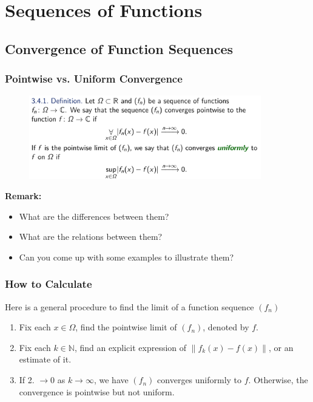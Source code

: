 \documentclass[10pt, t]{beamer}
\newcommand{\N}{\mathbb{N}}
\begin{document}
\section{Sequences of Functions}
\subsection{Convergence of Function Sequences}
\begin{frame}
    \frametitle{Pointwise vs. Uniform Convergence}

    \begin{figure}[H]
        \centering
        \includegraphics[width=0.9\textwidth]{2020-11-17-20-53-36.png}
    \end{figure}
    \textbf{Remark:}
    \begin{itemize}
        \item What are the differences between them?
        \item What are the relations between them?
        \item Can you come up with some examples to illustrate them?
    \end{itemize}

\end{frame}

\begin{frame}
    \frametitle{How to Calculate}

    Here is a general procedure to find the limit of a function sequence $(f_n)$
    \begin{enumerate}
        \item Fix each $x\in\Omega$, find the pointwise limit of $(f_n)$, denoted by $f$.
        \item Fix each $k\in \N$, find an explicit expression of $\|f_k(x)-f(x)\|$, or an estimate of it.
        \item If 2. $\to 0$ as $k\to \infty$, we have $(f_n)$ converges uniformly to $f$. Otherwise, the convergence is pointwise but not uniform.
    \end{enumerate}
\end{frame}
\end{document}
